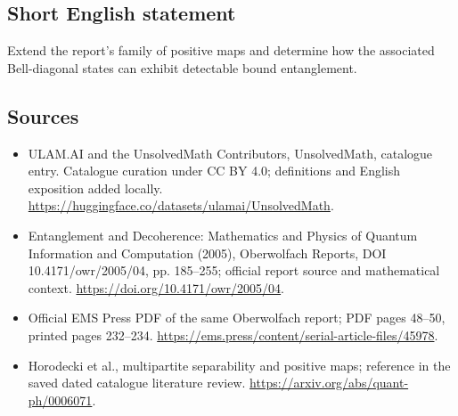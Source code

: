 \documentclass[11pt]{article}
\begin{document}
\subsection{Short English statement}
Extend the report's family of positive maps and determine how the associated Bell-diagonal states can exhibit detectable bound entanglement.
\subsection{Sources}
\begin{itemize}
\item[\hypertarget{source:statement:1}{S1}] ULAM.AI and the UnsolvedMath Contributors, UnsolvedMath, catalogue entry. Catalogue curation under CC BY 4.0; definitions and English exposition added locally.
\url{https://huggingface.co/datasets/ulamai/UnsolvedMath}.
\item[\hypertarget{source:statement:2}{S2}] Entanglement and Decoherence: Mathematics and Physics of Quantum Information and Computation (2005), Oberwolfach Reports, DOI 10.4171/owr/2005/04, pp. 185--255; official report source and mathematical context.
\url{https://doi.org/10.4171/owr/2005/04}.
\item[\hypertarget{source:statement:3}{S3}] Official EMS Press PDF of the same Oberwolfach report; PDF pages 48--50, printed pages 232--234.
\url{https://ems.press/content/serial-article-files/45978}.
\item[\hypertarget{source:statement:4}{S4}] Horodecki et al., multipartite separability and positive maps; reference in the saved dated catalogue literature review.
\url{https://arxiv.org/abs/quant-ph/0006071}.
\end{itemize}
\label{end:statement}
\end{document}

